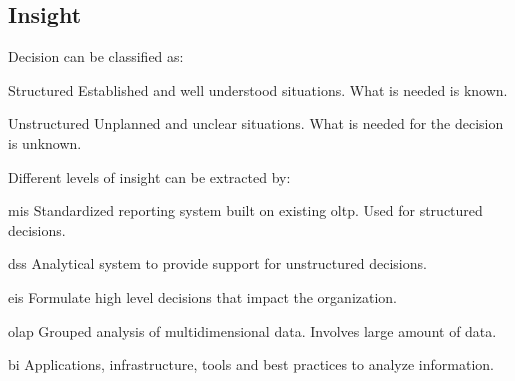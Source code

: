 \subsection{Insight}
Decision can be classified as:
\begin{descriptionlist}
    \item[Structured] 
        Established and well understood situations.
        What is needed is known.
    \item[Unstructured] 
        Unplanned and unclear situations.
        What is needed for the decision is unknown.
\end{descriptionlist}

Different levels of insight can be extracted by:
\begin{descriptionlist}
    \item[\Ac{mis}] 
        Standardized reporting system built on existing \ac{oltp}.
        Used for structured decisions.

    \item[\Ac{dss}] 
        Analytical system to provide support for unstructured decisions.

    \item[\Ac{eis}] 
        Formulate high level decisions that impact the organization.

    \item[\Ac{olap}] 
        Grouped analysis of multidimensional data.
        Involves large amount of data.

    \item[\Ac{bi}] 
        Applications, infrastructure, tools and best practices to analyze information.
\end{descriptionlist}



